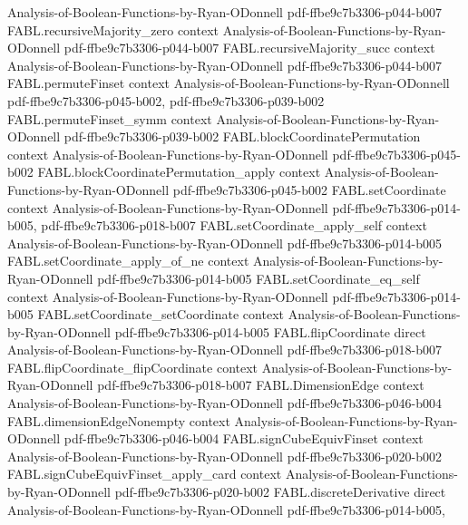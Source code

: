 \begin{theorem}
  {Analysis-of-Boolean-Functions-by-Ryan-ODonnell}
  {pdf-ffbe9c7b3306-p044-b007}
\proofstep
  {FABL.recursiveMajority_zero}
  {context}
  {Analysis-of-Boolean-Functions-by-Ryan-ODonnell}
  {pdf-ffbe9c7b3306-p044-b007}
\proofstep
  {FABL.recursiveMajority_succ}
  {context}
  {Analysis-of-Boolean-Functions-by-Ryan-ODonnell}
  {pdf-ffbe9c7b3306-p044-b007}
\proofstep
  {FABL.permuteFinset}
  {context}
  {Analysis-of-Boolean-Functions-by-Ryan-ODonnell}
  {pdf-ffbe9c7b3306-p045-b002,
    pdf-ffbe9c7b3306-p039-b002}
\proofstep
  {FABL.permuteFinset_symm}
  {context}
  {Analysis-of-Boolean-Functions-by-Ryan-ODonnell}
  {pdf-ffbe9c7b3306-p039-b002}
\proofstep
  {FABL.blockCoordinatePermutation}
  {context}
  {Analysis-of-Boolean-Functions-by-Ryan-ODonnell}
  {pdf-ffbe9c7b3306-p045-b002}
\proofstep
  {FABL.blockCoordinatePermutation_apply}
  {context}
  {Analysis-of-Boolean-Functions-by-Ryan-ODonnell}
  {pdf-ffbe9c7b3306-p045-b002}
\proofstep
  {FABL.setCoordinate}
  {context}
  {Analysis-of-Boolean-Functions-by-Ryan-ODonnell}
  {pdf-ffbe9c7b3306-p014-b005,
    pdf-ffbe9c7b3306-p018-b007}
\proofstep
  {FABL.setCoordinate_apply_self}
  {context}
  {Analysis-of-Boolean-Functions-by-Ryan-ODonnell}
  {pdf-ffbe9c7b3306-p014-b005}
\proofstep
  {FABL.setCoordinate_apply_of_ne}
  {context}
  {Analysis-of-Boolean-Functions-by-Ryan-ODonnell}
  {pdf-ffbe9c7b3306-p014-b005}
\proofstep
  {FABL.setCoordinate_eq_self}
  {context}
  {Analysis-of-Boolean-Functions-by-Ryan-ODonnell}
  {pdf-ffbe9c7b3306-p014-b005}
\proofstep
  {FABL.setCoordinate_setCoordinate}
  {context}
  {Analysis-of-Boolean-Functions-by-Ryan-ODonnell}
  {pdf-ffbe9c7b3306-p014-b005}
\proofstep
  {FABL.flipCoordinate}
  {direct}
  {Analysis-of-Boolean-Functions-by-Ryan-ODonnell}
  {pdf-ffbe9c7b3306-p018-b007}
\proofstep
  {FABL.flipCoordinate_flipCoordinate}
  {context}
  {Analysis-of-Boolean-Functions-by-Ryan-ODonnell}
  {pdf-ffbe9c7b3306-p018-b007}
\proofstep
  {FABL.DimensionEdge}
  {context}
  {Analysis-of-Boolean-Functions-by-Ryan-ODonnell}
  {pdf-ffbe9c7b3306-p046-b004}
\proofstep
  {FABL.dimensionEdgeNonempty}
  {context}
  {Analysis-of-Boolean-Functions-by-Ryan-ODonnell}
  {pdf-ffbe9c7b3306-p046-b004}
\proofstep
  {FABL.signCubeEquivFinset}
  {context}
  {Analysis-of-Boolean-Functions-by-Ryan-ODonnell}
  {pdf-ffbe9c7b3306-p020-b002}
\proofstep
  {FABL.signCubeEquivFinset_apply_card}
  {context}
  {Analysis-of-Boolean-Functions-by-Ryan-ODonnell}
  {pdf-ffbe9c7b3306-p020-b002}
\proofstep
  {FABL.discreteDerivative}
  {direct}
  {Analysis-of-Boolean-Functions-by-Ryan-ODonnell}
  {pdf-ffbe9c7b3306-p014-b005,
}
\end{theorem}
